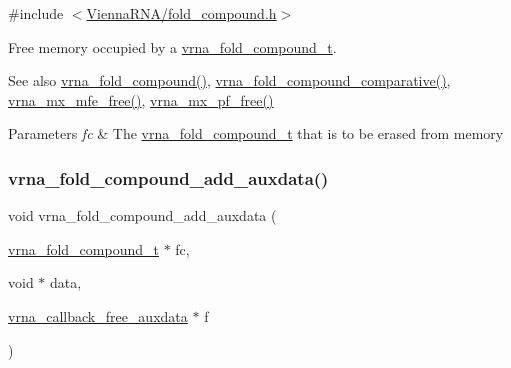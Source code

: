 {\ttfamily \#include $<$\mbox{\hyperlink{fold__compound_8h}{Vienna\+R\+N\+A/fold\+\_\+compound.\+h}}$>$}



Free memory occupied by a \mbox{\hyperlink{group__fold__compound_ga1b0cef17fd40466cef5968eaeeff6166}{vrna\+\_\+fold\+\_\+compound\+\_\+t}}. 

\begin{DoxySeeAlso}{See also}
\mbox{\hyperlink{group__fold__compound_ga6601d994ba32b11511b36f68b08403be}{vrna\+\_\+fold\+\_\+compound()}}, \mbox{\hyperlink{group__fold__compound_gad6bacc816af274922b13d947f708aa0c}{vrna\+\_\+fold\+\_\+compound\+\_\+comparative()}}, \mbox{\hyperlink{group__dp__matrices_ga6a9422feb5dfe5c64050cebf447672d0}{vrna\+\_\+mx\+\_\+mfe\+\_\+free()}}, \mbox{\hyperlink{group__dp__matrices_ga2283e69fd139fb8e58d7ade3b5773f9c}{vrna\+\_\+mx\+\_\+pf\+\_\+free()}}
\end{DoxySeeAlso}

\begin{DoxyParams}{Parameters}
{\em fc} & The \mbox{\hyperlink{group__fold__compound_ga1b0cef17fd40466cef5968eaeeff6166}{vrna\+\_\+fold\+\_\+compound\+\_\+t}} that is to be erased from memory \\
\hline
\end{DoxyParams}
\mbox{\label{group__fold__compound_gafc44c76a1aacf61bfccb8cd698772b98}} 
\subsubsection{\texorpdfstring{vrna\_fold\_compound\_add\_auxdata()}{vrna\_fold\_compound\_add\_auxdata()}}
{\footnotesize\ttfamily void vrna\+\_\+fold\+\_\+compound\+\_\+add\+\_\+auxdata (\begin{DoxyParamCaption}\item[{\mbox{\hyperlink{group__fold__compound_ga1b0cef17fd40466cef5968eaeeff6166}{vrna\+\_\+fold\+\_\+compound\+\_\+t}} $\ast$}]{fc,  }\item[{void $\ast$}]{data,  }\item[{\mbox{\hyperlink{group__fold__compound_ga7806651f51b195013839a218b3bbd5a3}{vrna\+\_\+callback\+\_\+free\+\_\+auxdata}} $\ast$}]{f }\end{DoxyParamCaption})}



